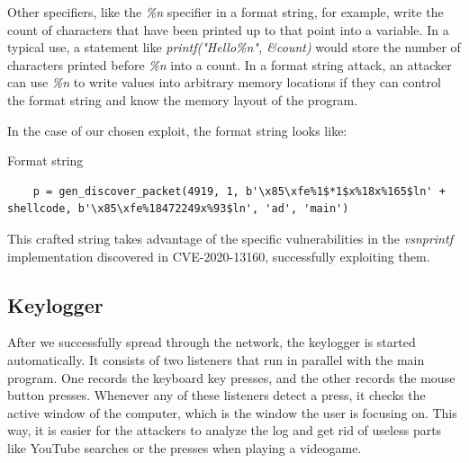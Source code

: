 Other specifiers, like the \textit{\%n} specifier in a format string, for example, write the count of characters that have been printed up to that point into a variable. In a typical use, a statement like \textit{printf("Hello\%n", \&count)} would store the number of characters printed before \textit{\%n} into a count. In a format string attack, an attacker can use \textit{\%n} to write values into arbitrary memory locations if they can control the format string and know the memory layout of the program.

In the case of our chosen exploit, the format string looks like:

\begin{codesnippet}[H]
    \caption{Format string}
    \label{code:format_string}
\end{codesnippet}
\vspace{-0.75cm}
\begin{lstlisting}
    p = gen_discover_packet(4919, 1, b'\x85\xfe%1$*1$x%18x%165$ln' + shellcode, b'\x85\xfe%18472249x%93$ln', 'ad', 'main')
\end{lstlisting}

This crafted string takes advantage of the specific vulnerabilities in the \textit{vsnprintf} implementation discovered in CVE-2020-13160, successfully exploiting them.


\subsection{Keylogger}
\label{sec:keylogger}

After we successfully spread through the network, the keylogger is started automatically. It consists of two listeners that run in parallel with the main program. One records the keyboard key presses, and the other records the mouse button presses. Whenever any of these listeners detect a press, it checks the active window of the computer, which is the window the user is focusing on. This way, it is easier for the attackers to analyze the log and get rid of useless parts like YouTube searches or the presses when playing a videogame.

